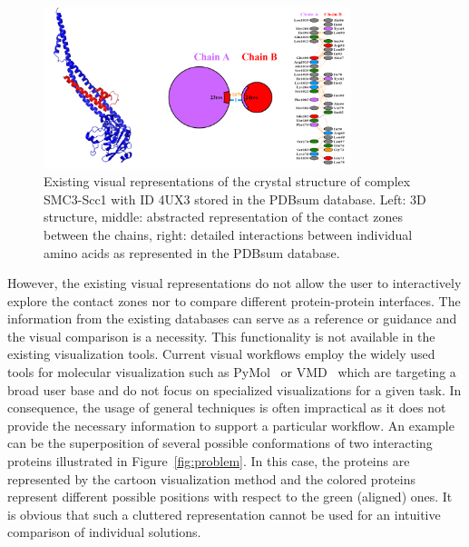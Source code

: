 \documentclass[11pt,a4paper,titlepage,oneside,onecolumn]{article}
\begin{document}
\begin{figure}[h]
  \centering
  \includegraphics[width=0.8\textwidth]{pics/pdbsum3.png}
  \caption{Existing visual representations of the crystal structure of complex SMC3-Scc1 with ID 4UX3 stored in the PDBsum database. Left: 3D structure, middle: abstracted representation of the contact zones between the chains, right: detailed interactions between individual amino acids as represented in the PDBsum database.}
  \label{fig:pdbsum}
\end{figure}

However, the existing visual representations do not allow the user to interactively explore the contact zones nor to compare different protein-protein interfaces.
The information from the existing databases can serve as a reference or guidance and the visual comparison is a necessity.
This functionality is not available in the existing visualization tools.
Current visual workflows employ the widely used tools for molecular visualization such as PyMol~\cite{pymol} or VMD~\cite{VMD} which are targeting a broad user base and do not focus on specialized visualizations for a given task.
In consequence, the usage of general techniques is often impractical as it does not  provide the necessary information to support a particular workflow.
An example can be the superposition of several possible conformations of two interacting proteins illustrated in Figure~\ref{fig:problem}.
In this case, the proteins are represented by the cartoon visualization method and the colored proteins represent different possible positions with respect to the green (aligned) ones.
It is obvious that such a cluttered representation cannot be used for an intuitive comparison of individual solutions.
\end{document}
